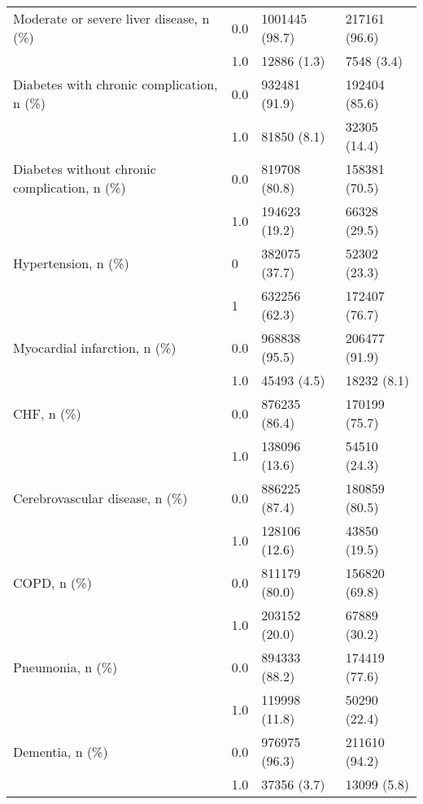 \begin{tabular}{llll}
Moderate or severe liver disease, n (\%) & 0.0 &                 1001445 (98.7) &     217161 (96.6) \\
                                       & 1.0 &                    12886 (1.3) &        7548 (3.4) \\
Diabetes with chronic complication, n (\%) & 0.0 &                  932481 (91.9) &     192404 (85.6) \\
                                       & 1.0 &                    81850 (8.1) &      32305 (14.4) \\
Diabetes without chronic complication, n (\%) & 0.0 &                  819708 (80.8) &     158381 (70.5) \\
                                       & 1.0 &                  194623 (19.2) &      66328 (29.5) \\
Hypertension, n (\%) & 0 &                  382075 (37.7) &      52302 (23.3) \\
                                       & 1 &                  632256 (62.3) &     172407 (76.7) \\
Myocardial infarction, n (\%) & 0.0 &                  968838 (95.5) &     206477 (91.9) \\
                                       & 1.0 &                    45493 (4.5) &       18232 (8.1) \\
CHF, n (\%) & 0.0 &                  876235 (86.4) &     170199 (75.7) \\
                                       & 1.0 &                  138096 (13.6) &      54510 (24.3) \\
Cerebrovascular disease, n (\%) & 0.0 &                  886225 (87.4) &     180859 (80.5) \\
                                       & 1.0 &                  128106 (12.6) &      43850 (19.5) \\
COPD, n (\%) & 0.0 &                  811179 (80.0) &     156820 (69.8) \\
                                       & 1.0 &                  203152 (20.0) &      67889 (30.2) \\
Pneumonia, n (\%) & 0.0 &                  894333 (88.2) &     174419 (77.6) \\
                                       & 1.0 &                  119998 (11.8) &      50290 (22.4) \\
Dementia, n (\%) & 0.0 &                  976975 (96.3) &     211610 (94.2) \\
                                       & 1.0 &                    37356 (3.7) &       13099 (5.8) \\

\end{tabular}
